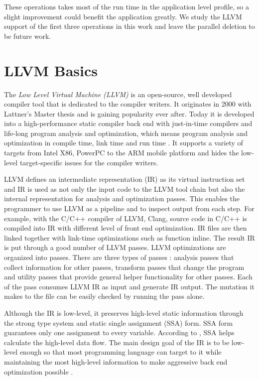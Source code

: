 These operations takes most of the run time in the application level profile, so a slight improvement could benefit the application greatly. We study the LLVM support of the first three operations in this work and leave the parallel deletion to be future work.

\section{LLVM Basics}
The \textit{Low Level Virtual Machine (LLVM)} is an open-source, well developed compiler tool that is dedicated to the compiler writers. It originates in 2000 with Lattner's Master thesis \cite{chris_msthesis} and is gaining popularity ever after. Today it is developed into a high-performance static compiler back end with just-in-time compilers and life-long program analysis and optimization, which means program analysis and optimization in compile time, link time and run time \cite{llvm_ghc, llvm_cgo04}. It supports a variety of targets from Intel X86, PowerPC to the ARM mobile platform and hides the low-level target-specific issues for the compiler writers.

LLVM defines an intermediate representation (IR) as its virtual instruction set and IR is used as not only the input code to the LLVM tool chain but also the internal representation for analysis and optimization passes. This enables the programmer to use LLVM as a pipeline and to inspect output from each step. For example, with the C/C++ compiler of LLVM, Clang, source code in C/C++ is compiled into IR with different level of front end optimization. IR files are then linked together with link-time optimizations such as function inline. The result IR is put through a good number of LLVM passes. LLVM optimizations are organized into passes. There are three types of passes \cite{llvm_pass}: analysis passes that collect information for other passes, transform passes that change the program and utility passes that provide general helper functionality for other passes. Each of the pass consumes LLVM IR as input and generate IR output. The mutation it makes to the file can be easily checked by running the pass alone.

Although the IR is low-level, it preserves high-level static information through the strong type system and static single assignment (SSA) form. SSA form guarantees only one assignment to every variable. According to \cite{cytron1991efficiently}, SSA helps calculate the high-level data flow. The main design goal of the IR is to be low-level enough so that most programming language can target to it while maintaining the most high-level information to make aggressive back end optimization possible \cite{llvm_ghc}.

